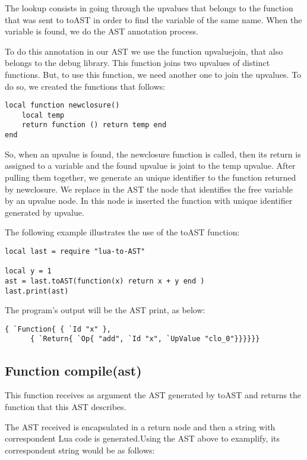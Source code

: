 \documentclass[english]{llncs}
\begin{document}
The lookup consists in going through the upvalues that belongs to the function that was sent to toAST in order to find the variable of the same name.
When the variable is found, we do the AST annotation process.

To do this annotation in our AST we use the function upvaluejoin, that also belongs to the debug library.
This function joins two upvalues of distinct functions.
But, to use this function, we need another one to join the upvalues. To do so, we created the functions that follows:


\begin{verbatim}
local function newclosure()
    local temp
    return function () return temp end
end
\end{verbatim}

So, when an upvalue is found, the newclosure function is called, then its return is assigned to a variable and the found upvalue is joint to the temp upvalue.
After pulling them together, we generate an unique identifier to the function returned by newclosure.
We replace in the AST the node that identifies the free variable by an upvalue node.
In this node is inserted the function with unique identifier generated by upvalue.


The following example illustrates the use of the toAST function:


\begin{verbatim}
local last = require "lua-to-AST"

local y = 1
ast = last.toAST(function(x) return x + y end )
last.print(ast)
\end{verbatim}


The program's output will be the AST print, as below:
\begin{verbatim}
{ `Function{ { `Id "x" },
      { `Return{ `Op{ "add", `Id "x", `UpValue "clo_0"}}}}}}
\end{verbatim}


\subsection{Function compile(ast) }


This function receives as argument the AST generated by toAST and returns the function that this AST describes.

The AST received is encapsulated in a return node and then a string with correspondent Lua code is generated.Using the AST above to examplify, its correspondent string would be as follows:
\end{document}
